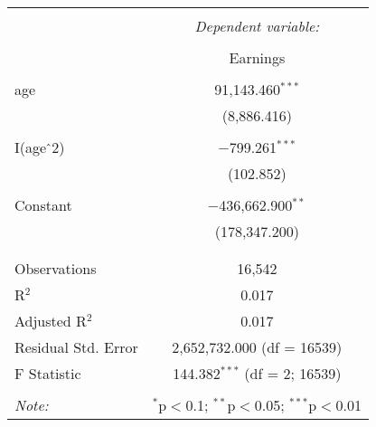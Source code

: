 
\begin{table}[!htbp] \centering 
  \caption{} 
  \label{} 
\begin{tabular}{@{\extracolsep{5pt}}lc} 
\\[-1.8ex]\hline 
\hline \\[-1.8ex] 
 & \multicolumn{1}{c}{\textit{Dependent variable:}} \\ 
\cline{2-2} 
\\[-1.8ex] & Earnings \\ 
\hline \\[-1.8ex] 
 age & 91,143.460$^{***}$ \\ 
  & (8,886.416) \\ 
  & \\ 
 I(age$\hat{\mkern6mu}$2) & $-$799.261$^{***}$ \\ 
  & (102.852) \\ 
  & \\ 
 Constant & $-$436,662.900$^{**}$ \\ 
  & (178,347.200) \\ 
  & \\ 
\hline \\[-1.8ex] 
Observations & 16,542 \\ 
R$^{2}$ & 0.017 \\ 
Adjusted R$^{2}$ & 0.017 \\ 
Residual Std. Error & 2,652,732.000 (df = 16539) \\ 
F Statistic & 144.382$^{***}$ (df = 2; 16539) \\ 
\hline 
\hline \\[-1.8ex] 
\textit{Note:}  & \multicolumn{1}{r}{$^{*}$p$<$0.1; $^{**}$p$<$0.05; $^{***}$p$<$0.01} \\ 
\end{tabular} 
\end{table} 
